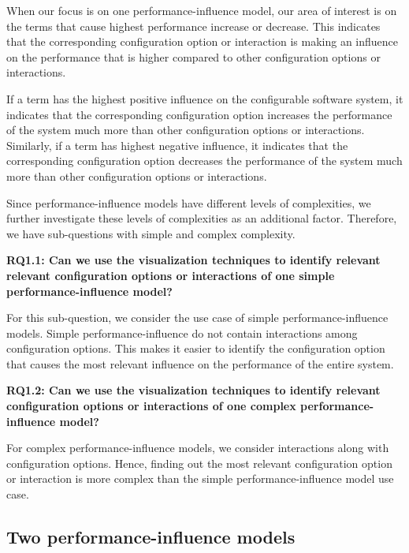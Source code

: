 When our focus is on one performance-influence model, our area of interest is on the terms that cause highest performance increase or decrease. This indicates that the corresponding configuration option or interaction is making an influence on the performance that is higher compared to other configuration options or interactions.

If a term has the highest positive influence on the configurable software system, it indicates that the corresponding configuration option increases the performance of the system much more than other configuration options or interactions. Similarly, if a term has highest negative influence, it indicates that the corresponding configuration option decreases the performance of the system much more than other configuration options or interactions.

Since performance-influence models have different levels of complexities, we further investigate these levels of complexities as an additional factor. Therefore, we have sub-questions with simple and complex complexity.

\begin{mdframed}
\textbf{RQ1.1: Can we use the visualization techniques to identify relevant relevant configuration options or interactions of one simple performance-influence model?}
\end{mdframed}

For this sub-question, we consider the use case of simple performance-influence models. Simple performance-influence do not contain interactions among configuration options. This makes it easier to identify the configuration option that causes the most relevant influence on the performance of the entire system.

\begin{mdframed}
\textbf{RQ1.2: Can we use the visualization techniques to identify relevant configuration options or interactions of one complex performance-influence model?}
\end{mdframed}

For complex performance-influence models, we consider interactions along with configuration options. Hence, finding out the most relevant configuration option or interaction is more complex than the simple performance-influence model use case. 

\subsection{Two performance-influence models}

